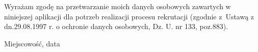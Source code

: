 \documentclass[helvetica,narrow,openbib,polish]{europecv}
\begin{document}
\begin{europecv}
%

\end{europecv}

Wyra\.zam zgod\k{e} na przetwarzanie moich danych osobowych zawartych w niniejszej aplikacji dla potrzeb realizacji procesu rekrutacji (zgodnie z~Ustaw\k{a} z dn.29.08.1997 r. o ochronie danych osobowych, Dz. U. nr 133, poz.883).
\vspace{0.5cm}
\begin{flushright}
Miejscowo\'s\'c, data
\end{flushright}
\end{document}
